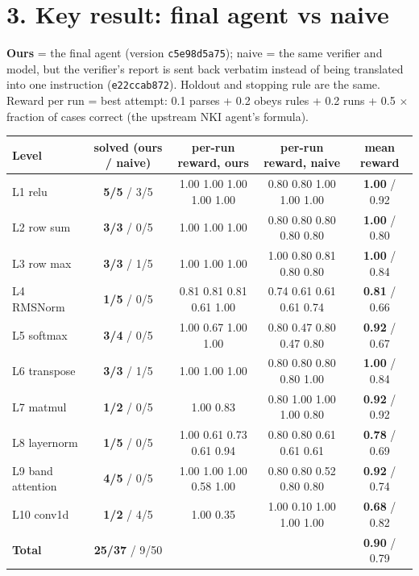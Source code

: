 \documentclass[11pt]{article}
\newcommand{\code}[1]{\texttt{#1}}
\newcommand{\ours}[1]{\textcolor{blue!60!black}{\textbf{#1}}}
\newcommand{\naive}[1]{\textcolor{orange!70!black}{#1}}
\begin{document}
\section*{3. Key result: final agent vs naive}
\ours{Ours} = the final agent (version \code{c5e98d5a75}); \naive{naive} = the same verifier and model, but
the verifier's report is sent back verbatim instead of being translated into one instruction
(\code{e22ccab872}). Holdout and stopping rule are the same. Reward per run = best attempt: 0.1 parses
+ 0.2 obeys rules + 0.2 runs + 0.5 $\times$ fraction of cases correct (the upstream NKI agent's formula).

\begin{center}\small
\begin{tabular}{@{}lcccc@{}}\toprule
Level & solved (ours / naive) & per-run reward, ours & per-run reward, naive & mean reward \\\midrule
L1 relu & \ours{5/5} / \naive{3/5} & 1.00 1.00 1.00 1.00 1.00 & 0.80 0.80 1.00 1.00 1.00 & \ours{1.00} / \naive{0.92}\\
L2 row sum & \ours{3/3} / \naive{0/5} & 1.00 1.00 1.00 & 0.80 0.80 0.80 0.80 0.80 & \ours{1.00} / \naive{0.80}\\
L3 row max & \ours{3/3} / \naive{1/5} & 1.00 1.00 1.00 & 1.00 0.80 0.81 0.80 0.80 & \ours{1.00} / \naive{0.84}\\
L4 RMSNorm & \ours{1/5} / \naive{0/5} & 0.81 0.81 0.81 0.61 1.00 & 0.74 0.61 0.61 0.61 0.74 & \ours{0.81} / \naive{0.66}\\
L5 softmax & \ours{3/4} / \naive{0/5} & 1.00 0.67 1.00 1.00 & 0.80 0.47 0.80 0.47 0.80 & \ours{0.92} / \naive{0.67}\\
L6 transpose & \ours{3/3} / \naive{1/5} & 1.00 1.00 1.00 & 0.80 0.80 0.80 0.80 1.00 & \ours{1.00} / \naive{0.84}\\
L7 matmul & \ours{1/2} / \naive{0/5} & 1.00 0.83 & 0.80 1.00 1.00 1.00 0.80 & \ours{0.92} / \naive{0.92}\\
L8 layernorm & \ours{1/5} / \naive{0/5} & 1.00 0.61 0.73 0.61 0.94 & 0.80 0.80 0.61 0.61 0.61 & \ours{0.78} / \naive{0.69}\\
L9 band attention & \ours{4/5} / \naive{0/5} & 1.00 1.00 1.00 0.58 1.00 & 0.80 0.80 0.52 0.80 0.80 & \ours{0.92} / \naive{0.74}\\
L10 conv1d & \ours{1/2} / \naive{4/5} & 1.00 0.35 & 1.00 0.10 1.00 1.00 1.00 & \ours{0.68} / \naive{0.82}\\
\midrule
\textbf{Total} & \ours{25/37} / \naive{9/50} & & & \ours{0.90} / \naive{0.79}\\
\bottomrule
\end{tabular}\end{center}
\vspace{-4pt}{\footnotesize The final agent's runs were still in progress at 18:40 (completed runs only,
hence 2--5 per level).}
\end{document}
